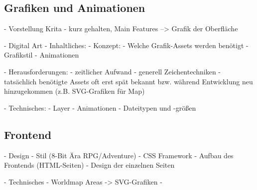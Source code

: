 

\subsection{Grafiken und Animationen}

- Vorstellung Krita
    - kurz gehalten, Main Features --> Grafik der Oberfläche

- Digital Art
    - Inhaltliches:
        - Konzept:
            - Welche Grafik-Assets werden benötigt
            - Grafikstil
            - Animationen
        
        - Herausforderungen: 
            - zeitlicher Aufwand 
            - generell Zeichentechniken
            - tatsächlich benötigte Assets oft erst spät bekannt bzw. während Entwicklung neu hinzugekommen (z.B. SVG-Grafiken für Map)
    
    - Technisches:
        - Layer
        - Animationen
        - Dateitypen und -größen


\subsection{Frontend}
    - Design
        - Stil (8-Bit Ära RPG/Adventure)
        - CSS Framework
        - Aufbau des Frontends (HTML-Seiten)
        - Design der einzelnen Seiten 

    - Technisches
        - Worldmap Areas -> SVG-Grafiken
        - 